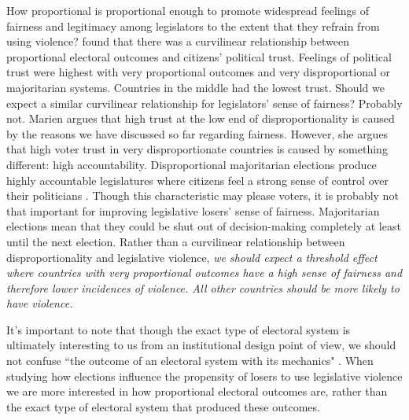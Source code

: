 \documentclass[a4paper]{article}\usepackage{graphicx, color}
\begin{document}
How proportional is proportional enough to promote widespread feelings of fairness and legitimacy among legislators to the extent that they refrain from using violence? \cite{Marien2011} found that there was a curvilinear relationship between proportional electoral outcomes and citizens' political trust. Feelings of political trust were highest with very proportional outcomes and very disproportional or majoritarian systems. Countries in the middle had the lowest trust. Should we expect a similar curvilinear relationship for legislators' sense of fairness? Probably not. Marien argues that high trust at the low end of disproportionality is caused by the reasons we have discussed so far regarding fairness. However, she argues that high voter trust in very disproportionate countries is caused by something different: high accountability. Disproportional majoritarian elections produce highly accountable legislatures where citizens feel a strong sense of control over their politicians \citep{Aarts2008,CHO2012}. Though this characteristic may please voters, it is probably not that important for improving legislative losers' sense of fairness. Majoritarian elections mean that they could be shut out of decision-making completely at least until the next election. Rather than a curvilinear relationship between disproportionality and legislative violence, \emph{we should expect a threshold effect where countries with very proportional outcomes have a high sense of fairness and therefore lower incidences of violence. All other countries should be more likely to have violence.} 

It's important to note that though the exact type of electoral system is ultimately interesting to us from an institutional design point of view, we should not confuse ``the outcome of an electoral system with its mechanics" \citep[][109]{Golder2005}. When studying how elections influence the propensity of losers to use legislative violence we are more interested in how proportional electoral outcomes are, rather than the exact type of electoral system that produced these outcomes. 
\end{document}
